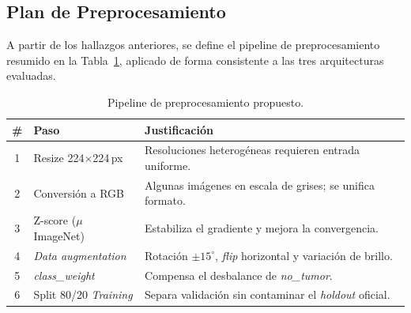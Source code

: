 \subsection{Plan de Preprocesamiento}
A partir de los hallazgos anteriores, se define el pipeline de
preprocesamiento resumido en la Tabla~\ref{tab:pipe}, aplicado
de forma consistente a las tres arquitecturas evaluadas.

\begin{table}[!t]
\centering
\caption{Pipeline de preprocesamiento propuesto.}
\label{tab:pipe}
\begin{tabularx}{\columnwidth}{clX}
\toprule
\textbf{\#} & \textbf{Paso} & \textbf{Justificación} \\
\midrule
1 & Resize 224$\times$224\,px & Resoluciones heterogéneas requieren entrada uniforme. \\
2 & Conversión a RGB           & Algunas imágenes en escala de grises; se unifica formato. \\
3 & Z-score ($\mu$ ImageNet)   & Estabiliza el gradiente y mejora la convergencia. \\
4 & \textit{Data augmentation} & Rotación $\pm 15^{\circ}$, \textit{flip} horizontal y variación de brillo. \\
5 & \textit{class\_weight}     & Compensa el desbalance de \textit{no\_tumor}. \\
6 & Split 80/20 \textit{Training} & Separa validación sin contaminar el \textit{holdout} oficial. \\
\bottomrule
\end{tabularx}
\end{table}
